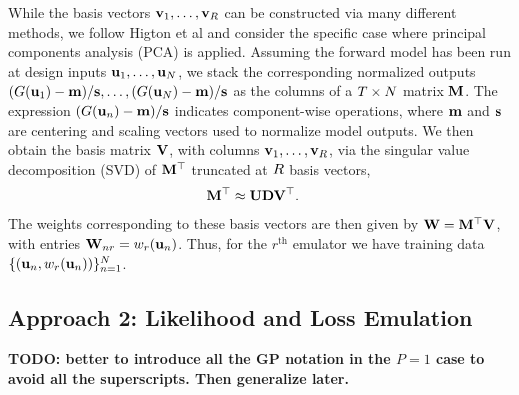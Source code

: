 \documentclass[12pt]{article}
\begin{document}
While the basis vectors $\mathbf{v}_1, \dots, \mathbf{v}_{R}$ can be constructed via many different methods, we follow Higton et al and 
consider the specific case where principal components analysis (PCA) is applied. Assuming the forward model has been run at design inputs $\mathbf{u}_1, \dots, \mathbf{u}_N$, we 
stack the corresponding normalized outputs $(G(\mathbf{u}_1) - \mathbf{m})/\mathbf{s}, \dots, (G(\mathbf{u}_N) - \mathbf{m})/\mathbf{s}$ as the columns of a 
$T \times N$ matrix $\mathbf{M}$. The expression $(G(\mathbf{u}_{n}) - \mathbf{m})/\mathbf{s}$ indicates component-wise operations, 
where $\mathbf{m}$ and $\mathbf{s}$ are centering and scaling vectors used to normalize model outputs. We then obtain the basis matrix $\mathbf{V}$, with columns 
$\mathbf{v}_1, \dots, \mathbf{v}_{R}$, via the singular value decomposition (SVD) of $\mathbf{M}^\top$ truncated at $R$ basis vectors, 
\begin{align}
\mathbf{M}^\top &\approx \mathbf{U} \mathbf{D} \mathbf{V}^\top. 
\end{align}
The weights corresponding to these basis vectors are then given by $\mathbf{W} = \mathbf{M}^\top \mathbf{V}$, with entries 
$\mathbf{W}_{n r} = w_{r}(\mathbf{u}_{n})$. Thus, for the $r^{\text{th}}$ emulator we have training data 
$\{(\mathbf{u}_{n},  w_{r}(\mathbf{u}_{n}))\}_{n = 1}^{N}$. 

\subsection{Approach 2: Likelihood and Loss Emulation}
\textbf{TODO: better to introduce all the GP notation in the $P = 1$ case to avoid all the superscripts. Then generalize later.}
\end{document}
